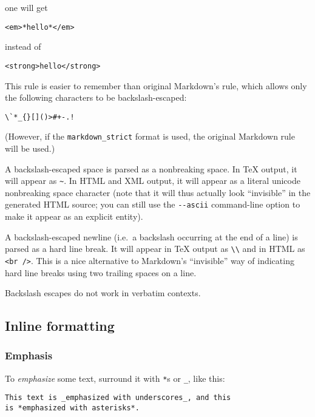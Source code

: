 \documentclass[
  a4paper,
]{article}
\begin{document}
one will get

\begin{verbatim}
<em>*hello*</em>
\end{verbatim}

instead of

\begin{verbatim}
<strong>hello</strong>
\end{verbatim}

This rule is easier to remember than original Markdown's rule, which
allows only the following characters to be backslash-escaped:

\begin{verbatim}
\`*_{}[]()>#+-.!
\end{verbatim}

(However, if the \texttt{markdown\_strict} format is used, the original
Markdown rule will be used.)

A backslash-escaped space is parsed as a nonbreaking space. In TeX
output, it will appear as \texttt{\textasciitilde{}}. In HTML and XML
output, it will appear as a literal unicode nonbreaking space character
(note that it will thus actually look ``invisible'' in the generated
HTML source; you can still use the \texttt{-\/-ascii} command-line
option to make it appear as an explicit entity).

A backslash-escaped newline (i.e.~a backslash occurring at the end of a
line) is parsed as a hard line break. It will appear in TeX output as
\texttt{\textbackslash{}\textbackslash{}} and in HTML as
\texttt{\textless{}br\ /\textgreater{}}. This is a nice alternative to
Markdown's ``invisible'' way of indicating hard line breaks using two
trailing spaces on a line.

Backslash escapes do not work in verbatim contexts.

\hypertarget{inline-formatting}{%
\subsection{Inline formatting}\label{inline-formatting}}

\hypertarget{emphasis}{%
\subsubsection{Emphasis}\label{emphasis}}

To \emph{emphasize} some text, surround it with \texttt{*}s or
\texttt{\_}, like this:

\begin{verbatim}
This text is _emphasized with underscores_, and this
is *emphasized with asterisks*.
\end{verbatim}
\end{document}

